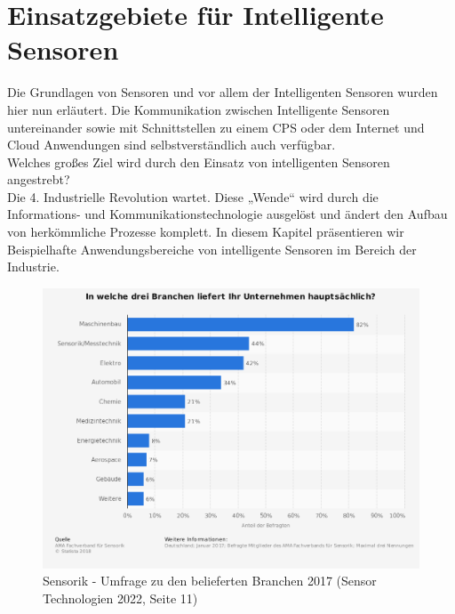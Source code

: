 \documentclass[a4paper,12pt]{scrartcl}
\begin{document}
\section{Einsatzgebiete für Intelligente Sensoren}
Die Grundlagen von Sensoren und vor allem der Intelligenten Sensoren wurden hier nun erläutert. Die Kommunikation zwischen Intelligente Sensoren untereinander sowie mit Schnittstellen zu einem CPS oder dem Internet und Cloud Anwendungen sind selbstverständlich auch verfügbar.\\
Welches großes Ziel wird durch den Einsatz von intelligenten Sensoren angestrebt?\\ Die 4. Industrielle Revolution wartet. Diese „Wende“ wird durch die Informations-
und Kommunikationstechnologie ausgelöst und ändert den Aufbau von herkömmliche Prozesse komplett.
In diesem Kapitel präsentieren wir Beispielhafte Anwendungsbereiche von intelligente Sensoren im Bereich der Industrie.\cite[Seite 7 ff.]{VogelHeuser.2016}

\begin{figure}[H]
\includegraphics[scale=0.45]{picture/SensorikBranchen}
\caption{Sensorik - Umfrage zu den belieferten Branchen 2017 (Sensor Technologien 2022, Seite 11)}
\label{fig:Sensorik - Umfrage zu den belieferten Branchen 2017}
\end{figure}


\end{document}
